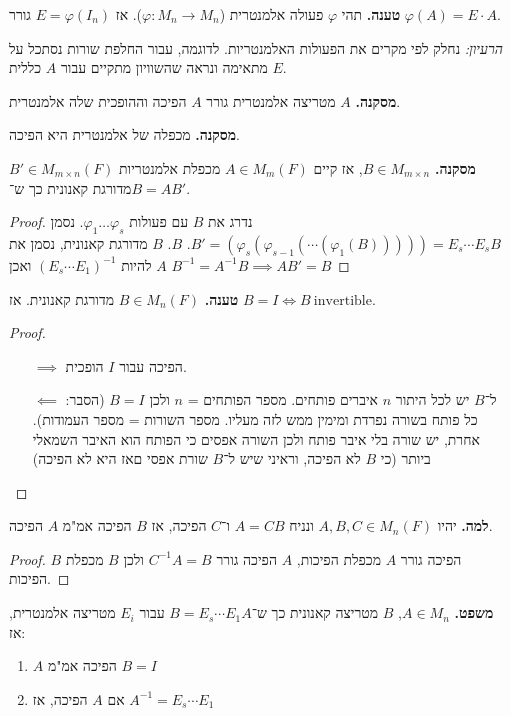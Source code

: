 \documentclass[]{article}
\newcommand\co        {\colon}
\newcommand\op    {^{-1}}
\renewcommand\phi     {\varphi}
\begin{document}
	\textbf{טענה. }תהי $\phi$ פעולה אלמנטרית ($\phi \co M_n \to M_n$). אז $E = \phi(I_n)$ גורר $\phi(A) = E \cdot A$. 
	
	\textit{הרעיון: }נחלק לפי מקרים את הפעולות האלמנטריות. לדוגמה, עבור החלפת שורות נסתכל על $E$ מתאימה ונראה שהשוויון מתקיים עבור $A$ כללית. 
	
	\textbf{מסקנה. }$A$ מטריצה אלמנטרית גורר $A$ הפיכה וההופכית שלה אלמנטרית. 
	
	\textbf{מסקנה. }מכפלה של אלמנטרית היא הפיכה. 
	
	\textbf{מסקנה. }$B \in M_{m \times n}$, אז קיים $A \in M_m(F)$ מכפלת אלמנטריות $B' \in M_{m \times n}(F)$ מדורגת קאנונית כך ש־$B = AB'$. 
	
	\begin{proof}
		נדרג את $B$ עם פעולות $\phi_1 \dots \phi_s$. נסמן $B' = (\phi_s(\phi_{s - 1}(\cdots(\phi_1(B))))) = E_s \cdots E_s B$. $B$. $B$ מדורגת קאנונית, נסמן את $A$ להיות $(E_s \cdots E_1)\op$ ואכן $B\op =  A\op B \implies A B' = B$
	\end{proof}
	
	\textbf{טענה. }$B \in M_n(F)$ מדורגת קאנונית. אז $B = I \iff B \ \mathrm{invertible}$. 
	
	\begin{proof}
		\begin{itemize}
			\item[$\implies$] הפיכה עבור $I$ הופכית. 
			\item[$\impliedby$] ל־$B$ יש לכל היתור $n$ איברים פותחים. מספר הפותחים = $n$ ולכן $B = I$ (הסבר: כל פותח בשורה נפרדת ומימין ממש לזה מעליו. מספר השורות = מספר העמודות). אחרת, יש שורה בלי איבר פותח ולכן השורה אפסים כי הפותח הוא האיבר השמאלי ביותר (כי $B$ לא הפיכה, וראיני שיש ל־$B$ שורת אפסי םאז היא לא הפיכה)
		\end{itemize}
	\end{proof}
	
	\textbf{למה. }יהיו $A, B, C \in M_n(F)$ ונניח $A = CB$ ו־$C$ הפיכה, אז $B$ הפיכה אמ"מ $A$ הפיכה. 
	
	\begin{proof}
		$B$ הפיכה גורר $A$ מכפלת הפיכות, $A$ הפיכה גורר $C\op A = B$ ולכן $B$ מכפלת הפיכות. 
	\end{proof}
	
	\textbf{משפט. }$A \in M_n$, $B$ מטריצה קאנונית כך ש־$B = E_s \cdots E_1A$ עבור $E_i$ מטריצה אלמנטרית, אז: 
	\begin{enumerate}
		\item $A$ הפיכה אמ"מ $B = I$
		\item אם $A$ הפיכה, אז $A\op = E_s \cdots E_1$
	\end{enumerate}
	
\end{document}
